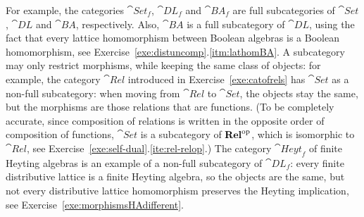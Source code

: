 For example, the categories $\cat{Set}_f$, $\cat{DL}_f$ and $\cat{BA}_f$ are full subcategories of $\cat{Set}$, $\cat{DL}$ and $\cat{BA}$, respectively. Also, $\cat{BA}$ is a full subcategory of $\cat{DL}$, using the fact that every lattice homomorphism between Boolean algebras is a Boolean homomorphism, see Exercise~\ref{exe:distuncomp}.\ref{itm:lathomBA}. A subcategory may only restrict morphisms, while keeping the same class of objects: for example, the category $\cat{Rel}$ introduced in Exercise~\ref{exe:catofrels} has $\cat{Set}$ as a non-full subcategory: when moving from $\cat{Rel}$ to $\cat{Set}$, the objects stay the same, but the morphisms are those relations that are functions. (To be completely accurate, since composition of relations is written in the opposite order of composition of functions, $\cat{Set}$ is a subcategory of $\mathbf{Rel}^{\mathrm{op}}$, which is isomorphic to $\cat{Rel}$, see Exercise~\ref{exe:self-dual}.\ref{ite:rel-relop}.) The category $\cat{Heyt}_f$ of finite Heyting algebras is an example of a non-full subcategory of $\cat{DL}_f$: every finite distributive lattice is a finite Heyting algebra, so the objects are the same, but not every distributive lattice homomorphism preserves the Heyting implication, see Exercise~\ref{exe:morphismsHAdifferent}.


